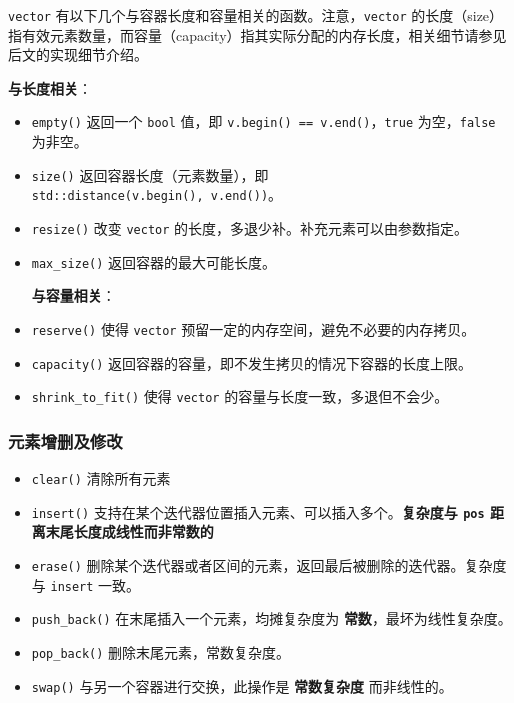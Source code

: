 \texttt{vector} 有以下几个与容器长度和容量相关的函数。注意，\texttt{vector} 的长度（size）指有效元素数量，而容量（capacity）指其实际分配的内存长度，相关细节请参见后文的实现细节介绍。

\textbf{与长度相关}：

\begin{itemize}
\item
  \texttt{empty()} 返回一个 \texttt{bool} 值，即 \texttt{v.begin()\ ==\ v.end()}，\texttt{true} 为空，\texttt{false} 为非空。
\item
  \texttt{size()} 返回容器长度（元素数量），即 \texttt{std::distance(v.begin(),\ v.end())}。
\item
  \texttt{resize()} 改变 \texttt{vector} 的长度，多退少补。补充元素可以由参数指定。
\item
  \texttt{max\_size()} 返回容器的最大可能长度。

  \textbf{与容量相关}：
\item
  \texttt{reserve()} 使得 \texttt{vector} 预留一定的内存空间，避免不必要的内存拷贝。
\item
  \texttt{capacity()} 返回容器的容量，即不发生拷贝的情况下容器的长度上限。
\item
  \texttt{shrink\_to\_fit()} 使得 \texttt{vector} 的容量与长度一致，多退但不会少。
\end{itemize}

\subsubsection{元素增删及修改}\label{ux5143ux7d20ux589eux5220ux53caux4feeux6539}

\begin{itemize}
\tightlist
\item
  \texttt{clear()} 清除所有元素
\item
  \texttt{insert()} 支持在某个迭代器位置插入元素、可以插入多个。\textbf{复杂度与 \texttt{pos} 距离末尾长度成线性而非常数的}
\item
  \texttt{erase()} 删除某个迭代器或者区间的元素，返回最后被删除的迭代器。复杂度与 \texttt{insert} 一致。
\item
  \texttt{push\_back()} 在末尾插入一个元素，均摊复杂度为 \textbf{常数}，最坏为线性复杂度。
\item
  \texttt{pop\_back()} 删除末尾元素，常数复杂度。
\item
  \texttt{swap()} 与另一个容器进行交换，此操作是 \textbf{常数复杂度} 而非线性的。
\end{itemize}

